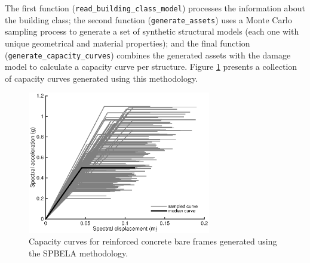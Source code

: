 The first function (\verb=read_building_class_model=) processes the information about the building class; the second function (\verb=generate_assets=) uses a Monte Carlo sampling process to generate a set of synthetic structural models (each one with unique geometrical and material properties); and the final function (\verb=generate_capacity_curves=) combines the generated assets with the damage model to calculate a capacity curve per structure. Figure \ref{fig:SPBELA_cc} presents a collection of capacity curves generated using this methodology.

\begin{figure}[htb]
  \centering
      \includegraphics[width=8cm]{figures/SPBELA_cc.eps}
  \caption{Capacity curves for reinforced concrete bare frames generated using the SPBELA methodology.}
  \label{fig:SPBELA_cc}
\end{figure}
